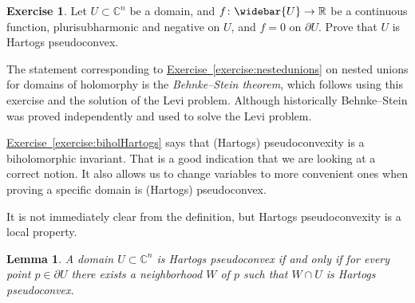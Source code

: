 \documentclass[12pt,openany]{book}
\newcommand{\C}{{\mathbb{C}}}
\newcommand{\R}{{\mathbb{R}}}
\newcommand{\myindex}[1]{#1\index{#1}}
\theoremstyle{plain}
\newtheorem{lemma}[thm]{Lemma}
\theoremstyle{remark}
\theoremstyle{definition}
\newenvironment{exbox}{%
    \def\FrameCommand{\vrule width 1pt \relax\hspace{10pt}}%
    \MakeFramed {\advance \hsize -\width \FrameRestore}%
}{%
    \endMakeFramed
}
\theoremstyle{exercise}
\newtheorem{exercise}{Exercise}[section]
\theoremstyle{example}
\newcommand{\exerciseref}[1]{\hyperref[#1]{Exercise~\ref*{#1}}}
\begin{document}
\begin{exbox}
\begin{exercise}
Let $U \subset \C^n$ be a domain, and $f \colon \widebar{U} \to \R$ be a
continuous function, plurisubharmonic and negative on $U$, and $f=0$ on $\partial
U$.  Prove that $U$ is Hartogs pseudoconvex.
\end{exercise}
\end{exbox}

The statement corresponding to \exerciseref{exercise:nestedunions} on nested unions
for domains of holomorphy is
the \emph{\myindex{Behnke--Stein theorem}}, which follows using this exercise and the solution
of the Levi problem.  Although historically Behnke--Stein was proved
independently and used to solve the Levi problem.

\exerciseref{exercise:biholHartogs} says that (Hartogs) pseudoconvexity is a
biholomorphic invariant.  That is a good indication that we are looking at a
correct notion.  It also allows us to change variables to more convenient
ones when proving a specific domain is (Hartogs) pseudoconvex.

It is not immediately clear from the definition, but Hartogs pseudoconvexity
is a local property.

\begin{lemma}
A domain $U \subset \C^n$ is Hartogs pseudoconvex if and only if
for every point $p \in \partial U$ there exists a neighborhood $W$ of $p$
such that $W \cap U$ is Hartogs pseudoconvex.
\end{lemma}
\end{document}
